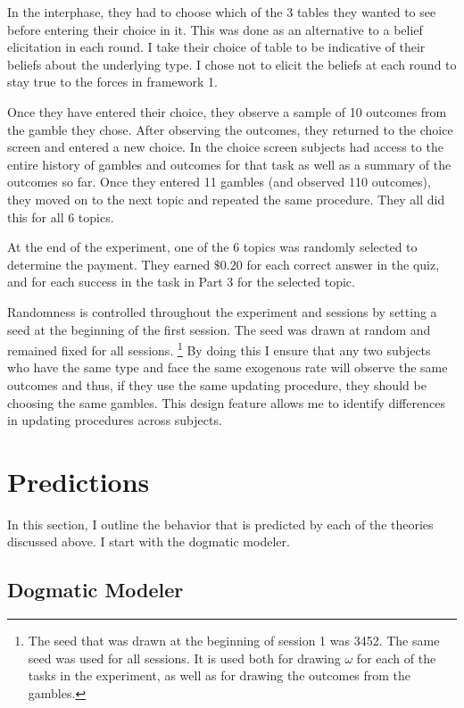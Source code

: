 \documentclass[
  12pt,
]{article}
\begin{document}
In the interphase, they had to choose which of the 3 tables they wanted
to see before entering their choice in it. This was done as an
alternative to a belief elicitation in each round. I take their choice
of table to be indicative of their beliefs about the underlying type. I
chose not to elicit the beliefs at each round to stay true to the forces
in framework 1.

Once they have entered their choice, they observe a sample of 10
outcomes from the gamble they chose. After observing the outcomes, they
returned to the choice screen and entered a new choice. In the choice
screen subjects had access to the entire history of gambles and outcomes
for that task as well as a summary of the outcomes so far. Once they
entered 11 gambles (and observed 110 outcomes), they moved on to the
next topic and repeated the same procedure. They all did this for all 6
topics.

At the end of the experiment, one of the 6 topics was randomly selected
to determine the payment. They earned \(\$0.20\) for each correct answer
in the quiz, and for each success in the task in Part 3 for the selected
topic.

Randomness is controlled throughout the experiment and sessions by
setting a seed at the beginning of the first session. The seed was drawn
at random and remained fixed for all sessions.
\footnote{The seed that was drawn 
at the beginning of session 1 was 3452. The same seed was used for all sessions. It is used both for drawing $\omega$ for each of 
the tasks in the experiment, as well as for drawing the outcomes from the gambles.}
By doing this I ensure that any two subjects who have the same type and
face the same exogenous rate will observe the same outcomes and thus, if
they use the same updating procedure, they should be choosing the same
gambles. This design feature allows me to identify differences in
updating procedures across subjects.

\hypertarget{predictions}{%
\section{Predictions}\label{predictions}}

In this section, I outline the behavior that is predicted by each of the
theories discussed above. I start with the dogmatic modeler.

\hypertarget{dogmatic-modeler}{%
\subsection{Dogmatic Modeler}\label{dogmatic-modeler}}
\end{document}
